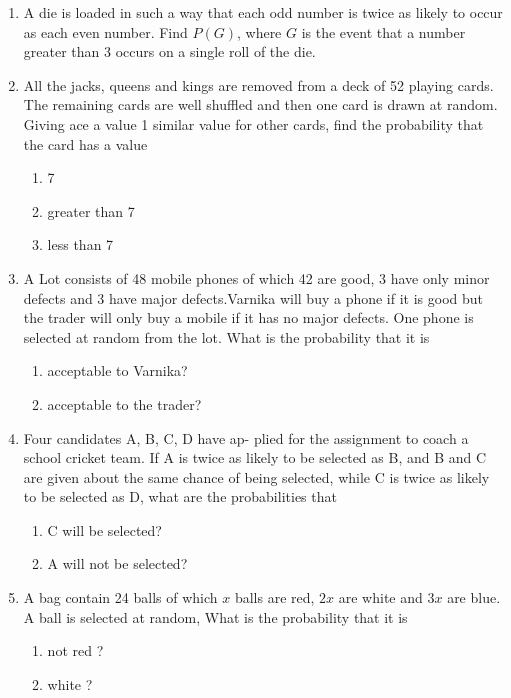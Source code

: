\begin{enumerate}[label=\thesection.\arabic*,ref=\thesection.\theenumi]
	\item  A die is loaded in such a way that each odd number is twice as likely to occur as
each even number. Find $P(G)$, where $G$ is the event that a number greater than
3 occurs on a single roll of the die.
\\
\solution
		
	\item All the jacks, queens and kings are removed from a deck of 52 playing cards. The remaining cards are well shuffled and then one card is drawn at random. Giving ace a value 1 similar value for other cards, find the probability that the card has a value 
		\begin{enumerate}
			\item 7
			\item greater than 7
			\item less than 7
		\end{enumerate}
		
  \item A Lot consists of 48 mobile phones of which 42 are good, 3 have only minor defects and 3 have major defects.Varnika will buy a phone if it is good but the trader will only buy a mobile if it has no major defects. One phone is selected at random from the lot. What is the probability that it is
\begin{enumerate}
	\item acceptable to Varnika?
            \item acceptable to the trader?
\end{enumerate}
\solution
	
   \item Four candidates A, B, C, D have ap-
plied for the assignment to coach a school cricket
team. If A is twice as likely to be selected as B, and
B and C are given about the same chance of being
selected, while C is twice as likely to be selected
as D, what are the probabilities that
\begin{enumerate}
\item C will be selected?
\item A will not be selected?
\end{enumerate}
	
 \item A bag contain 24 balls of which $x$ balls are red, $2x$ are white and $3x$ are blue. A ball is selected at random, What is the probability that it is
\begin{enumerate}[label=\alph*)]
\item not red ?
\item white ?
\end{enumerate}

\end{enumerate}
